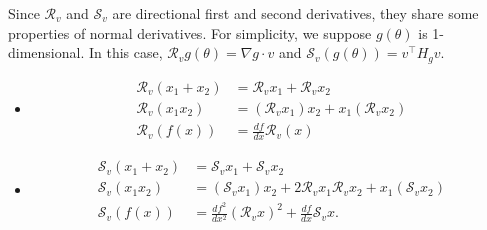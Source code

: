 \documentclass{amsart}
\theoremstyle{definition}
\theoremstyle{remark}
\numberwithin{equation}{section}
\newcommand{\cal}[1]{\mathcal{#1}}
\begin{document}
Since $\cal{R}_v$ and $\cal{S}_v$ are directional first and second derivatives, they share some properties of normal derivatives. For simplicity, we suppose $g(\theta)$ is 1-dimensional. In this case, $\cal{R}_v g(\theta) = \nabla g\cdot v$ and $\cal{S}_v (g(\theta)) = v^\intercal H_g v$.
\begin{itemize}
	\item 
	\begin{align*}
	\cal{R}_v(x_1+x_2) &= \cal{R}_v x_1 + \cal{R}_v x_2\\
	\cal{R}_v(x_1 x_2) &= (\cal{R}_v x_1)x_2 + x_1(\cal{R}_vx_2)\tag{Product rule}\\
	\cal{R}_v(f(x)) &= \frac{df}{dx}\cal{R}_v(x)\tag{Chain rule}
	\end{align*}
	\item
	\begin{align*}
	\cal{S}_v(x_1+x_2) &= \cal{S}_v x_1 + \cal{S}_v x_2\\
	\cal{S}_v(x_1 x_2) &= (\cal{S}_v x_1) x_2 + 2 \cal{R}_v x_1 \cal{R}_v x_2 + x_1(\cal{S}_v x_2)\tag{Product rule}\\
	\cal{S}_v(f(x)) &= \frac{df^2}{dx^2} (\cal{R}_v x)^2 + \frac{df}{dx} \cal{S}_v x\tag{Chain rule}.
	\end{align*}
\end{itemize}
\end{document}
